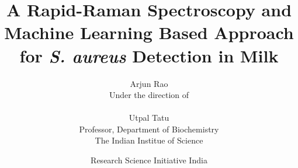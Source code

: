 

\title{A Rapid-Raman Spectroscopy and Machine Learning Based Approach for \textit{S. aureus} Detection in Milk}

\author{
Arjun Rao
\vspace{0.5in}\\
Under the direction of\\
\\
Utpal Tatu\\
Professor, Department of Biochemistry\\
The Indian Institue of Science\\
\vspace{1in}
}

\date{
Research Science Initiative India\\
\rsifinalpaperdate
}
